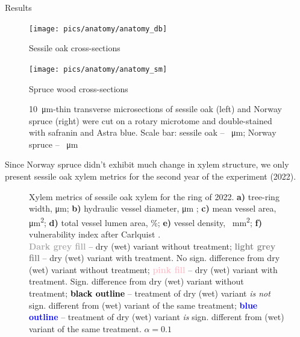 \documentclass[final]{beamer}
\newlength{\colwidth}
\begin{document}
\begin{frame}[t]
\begin{columns}[t]
\begin{column}{\colwidth}
\begin{block}{Results}
    \begin{figure}
        \begin{minipage}{0.45\textwidth}
            \centering \texttt{[image: pics/anatomy/anatomy\_db]}
            \caption*{Sessile oak cross-sections}
            \label{fig:anatomy_db}
        \end{minipage}\hfill
        \begin{minipage}{0.45\textwidth}
            \centering \texttt{[image: pics/anatomy/anatomy\_sm]}
            \caption*{Spruce wood cross-sections}
            \label{fig:anatomy_sm}
        \end{minipage}\hfill
        \caption{\SI{10}{\micro\meter}-thin transverse microsections of sessile oak (left) and Norway spruce (right) were cut on a rotary microtome and double-stained with safranin and Astra blue. Scale bar: sessile oak -- \SI{}{\micro\meter}; Norway spruce -- \SI{}{\micro\meter}}
    \end{figure}
    Since Norway spruce didn't exhibit much change in xylem structure, we only present sessile oak xylem metrics for the second year of the experiment (2022).
    \begin{figure}
        
        \caption{
            Xylem metrics of sessile oak xylem for the ring of 2022.
            \textbf{a)} tree-ring width, \si{\micro\meter};
            \textbf{b)} hydraulic vessel diameter, \si{\micro\meter} \parencite{tyree2002};
            \textbf{c)} mean vessel area, \si{\micro\meter\squared};
            \textbf{d)} total vessel lumen area, \%;
            \textbf{e)} vessel density, \si{\per\milli\meter\squared};
            \textbf{f)} vulnerability index after Carlquist \parencite{carlquist1977}. \\
            \textbf{\textcolor{darkgray}{Dark grey fill}} -- dry (wet) variant without treatment;
            \textbf{\textcolor{gray}{light grey fill}} -- dry (wet) variant with treatment. No sign. difference from dry (wet) variant without treatment;
            \textbf{\textcolor{pink}{pink fill}} -- dry (wet) variant with treatment. Sign. difference from dry (wet) variant without treatment;
            \textbf{\textcolor{black}{black outline}} -- treatment of dry (wet) variant \emph{is not} sign. different from (wet) variant of the same treatment;
            \textbf{\textcolor{blue}{blue outline}} -- treatment of dry (wet) variant \emph{is} sign. different from (wet) variant of the same treatment.
            $\alpha = 0.1$
        }
        \label{fig:oak_box}
    \end{figure}
\end{block}


\end{column}
\end{columns}
\end{frame}
\end{document}
